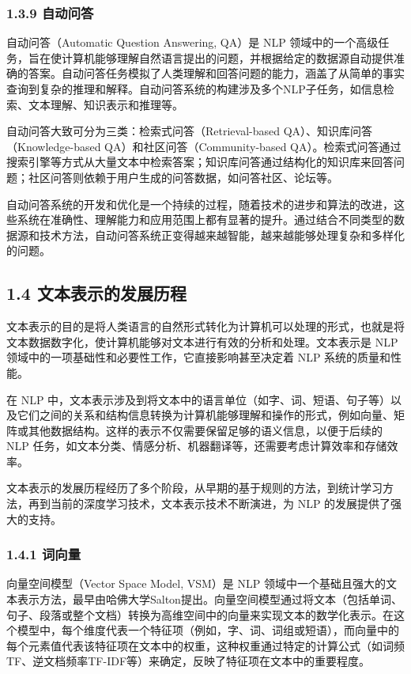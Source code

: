 \documentclass[
]{article}
\begin{document}
\subsubsection{1.3.9 自动问答}\label{ux81eaux52a8ux95eeux7b54}

自动问答（Automatic Question Answering, QA）是 NLP
领域中的一个高级任务，旨在使计算机能够理解自然语言提出的问题，并根据给定的数据源自动提供准确的答案。自动问答任务模拟了人类理解和回答问题的能力，涵盖了从简单的事实查询到复杂的推理和解释。自动问答系统的构建涉及多个NLP子任务，如信息检索、文本理解、知识表示和推理等。

自动问答大致可分为三类：检索式问答（Retrieval-based
QA）、知识库问答（Knowledge-based QA）和社区问答（Community-based
QA）。检索式问答通过搜索引擎等方式从大量文本中检索答案；知识库问答通过结构化的知识库来回答问题；社区问答则依赖于用户生成的问答数据，如问答社区、论坛等。

自动问答系统的开发和优化是一个持续的过程，随着技术的进步和算法的改进，这些系统在准确性、理解能力和应用范围上都有显著的提升。通过结合不同类型的数据源和技术方法，自动问答系统正变得越来越智能，越来越能够处理复杂和多样化的问题。

\subsection{1.4
文本表示的发展历程}\label{ux6587ux672cux8868ux793aux7684ux53d1ux5c55ux5386ux7a0b}

文本表示的目的是将人类语言的自然形式转化为计算机可以处理的形式，也就是将文本数据数字化，使计算机能够对文本进行有效的分析和处理。文本表示是
NLP 领域中的一项基础性和必要性工作，它直接影响甚至决定着 NLP
系统的质量和性能。

在 NLP
中，文本表示涉及到将文本中的语言单位（如字、词、短语、句子等）以及它们之间的关系和结构信息转换为计算机能够理解和操作的形式，例如向量、矩阵或其他数据结构。这样的表示不仅需要保留足够的语义信息，以便于后续的
NLP
任务，如文本分类、情感分析、机器翻译等，还需要考虑计算效率和存储效率。

文本表示的发展历程经历了多个阶段，从早期的基于规则的方法，到统计学习方法，再到当前的深度学习技术，文本表示技术不断演进，为
NLP 的发展提供了强大的支持。

\subsubsection{1.4.1 词向量}\label{ux8bcdux5411ux91cf}

向量空间模型（Vector Space Model, VSM）是 NLP
领域中一个基础且强大的文本表示方法，最早由哈佛大学Salton提出。向量空间模型通过将文本（包括单词、句子、段落或整个文档）转换为高维空间中的向量来实现文本的数学化表示。在这个模型中，每个维度代表一个特征项（例如，字、词、词组或短语），而向量中的每个元素值代表该特征项在文本中的权重，这种权重通过特定的计算公式（如词频TF、逆文档频率TF-IDF等）来确定，反映了特征项在文本中的重要程度。
\end{document}
